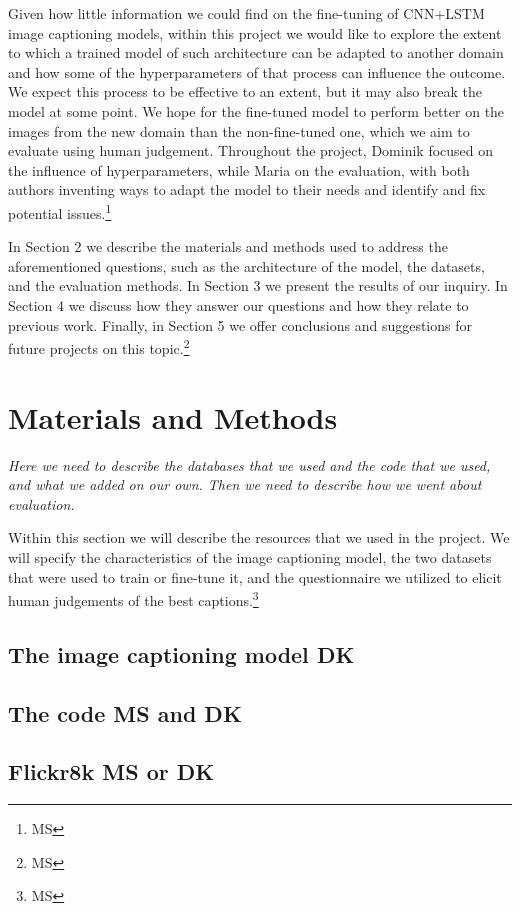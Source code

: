 \documentclass[11pt]{article}
\begin{document}
Given how little information we could find on the fine-tuning of CNN+LSTM image captioning models, within this project we would like to explore the extent to which a trained model of such architecture can be adapted to another domain and how some of the hyperparameters of that process can influence the outcome. We expect this process to be effective to an extent, but it may also break the model at some point. We hope for the fine-tuned model to perform better on the images from the new domain than the non-fine-tuned one, which we aim to evaluate using human judgement. Throughout the project, Dominik focused on the influence of hyperparameters, while Maria on the evaluation, with both authors inventing ways to adapt the model to their needs and identify and fix potential issues.\footnote{MS} 

In Section 2 we describe the materials and methods used to address the aforementioned questions, such as the architecture of the model, the datasets, and the evaluation methods. In Section 3 we present the results of our inquiry. In Section 4 we discuss how they answer our questions and how they relate to previous work. Finally, in Section 5 we offer conclusions and suggestions for future projects on this topic.\footnote{MS}

\section{Materials and Methods}

\textit{Here we need to describe the databases that we used and the code that we used, and what we added on our own. Then we need to describe how we went about evaluation.}

Within this section we will describe the resources that we used in the project. We will specify the characteristics of the image captioning model, the two datasets that were used to train or fine-tune it, and the questionnaire we utilized to elicit human judgements of the best captions.\footnote{MS}

\subsection{The image captioning model \textbf{DK}}
\subsection{The code \textbf{MS and DK}}
\subsection{Flickr8k \textbf{MS or DK}}
\end{document}
